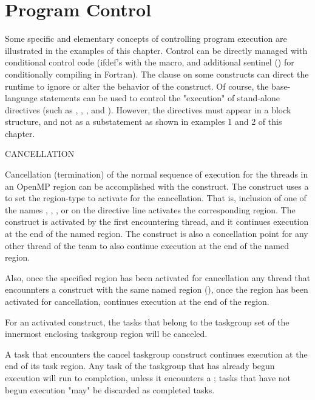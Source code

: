 \pagebreak
\chapter{Program Control}
\label{sec:program_control}

Some specific and elementary concepts of controlling program execution are
illustrated in the examples of this chapter.  Control can be directly
managed with conditional control code (ifdef's with the  
macro, and additional sentinel (\code{!\$}) 
for conditionally compiling in Fortran). The  clause on some constructs
can direct the runtime to ignore or alter the behavior of the construct.
Of course, the base-language  statements can be used to control the "execution" 
of stand-alone directives (such as , , , and  ).
However, the directives must appear in a block structure, and not as a substatement as shown in examples 1 and 2 of this chapter.


CANCELLATION

Cancellation (termination) of the normal sequence of execution for the threads in an OpenMP region can
be  accomplished with the  construct.  The construct uses a
 to set the region-type to activate for the cancellation. 
That is, inclusion  of one of the  names , , 
,  or  on the directive line 
activates the corresponding region.  
The  construct is activated by the first encountering thread,  and it
continues execution at the end of the named region.
The  construct is also a concellation point for any other thread of the team 
to also continue execution at the end of the named region.  

Also, once the specified region has been activated for cancellation any thread that encounnters 
a  construct with the same named region (),
once the region has been activated for cancellation, continues execution at the end of the region.

For an activated  construct, the tasks that
belong to the taskgroup set of the innermost enclosing taskgroup region will be canceled. 

A task that encounters the cancel taskgroup construct continues execution at the end of its
task region. Any task of the taskgroup that has already begun execution will run to completion,
unless it encounters a ; tasks that have not begun execution "may" be
discarded as completed tasks.

